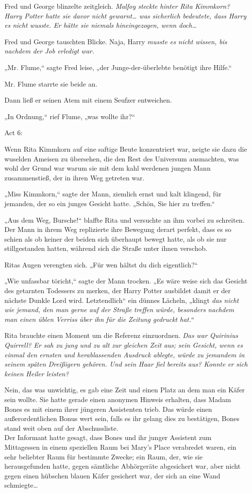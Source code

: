 {Fred und George blinzelte zeitgleich. \emph{Malfoy steckte hinter Rita Kimmkorn? Harry Potter hatte sie davor nicht gewarnt… was sicherlich bedeutete, dass Harry es nicht wusste. Er hätte sie niemals hineingezogen, wenn doch…}

Fred und George tauschten Blicke. Naja, Harry \emph{musste es nicht wissen, bis nachdem der Job erledigt war.}

„Mr. Flume,“ sagte Fred leise, „der Junge-der-überlebte benötigt ihre Hilfe.“

Mr. Flume starrte sie beide an.

Dann ließ er seinen Atem mit einem Seufzer entweichen.

„In Ordnung,“ rief Flume, „was wollte ihr?“

Act 6:

Wenn Rita Kimmkorn auf eine saftige Beute konzentriert war, neigte sie dazu die wuselden Ameisen zu übersehen, die den Rest des Universum ausmachten, was wohl der Grund war warum sie mit dem kahl werdenen jungen Mann zusammenstieß, der in ihren Weg getreten war.

„Miss Kimmkorn,“ sagte der Mann, ziemlich ernst und kalt klingend, für jemanden, der so ein junges Gesicht hatte. „Schön, Sie hier zu treffen.“

„Aus dem Weg, Bursche!“ blaffte Rita und versuchte an ihm vorbei zu schreiten. Der Mann in ihrem Weg replizierte ihre Bewegung derart perfekt, dass es so schien als ob keiner der beiden sich überhaupt bewegt hatte, als ob sie nur stillgestanden hatten, während sich die Straße unter ihnen verschob.

Ritas Augen verengten sich. „Für wen hältst du dich eigentlich?“

„Wie unfassbar töricht,“ sagte der Mann trocken. „Es wäre weise sich das Gesicht des getarnten Todessers zu merken, der Harry Potter ausbildet damit er der nächste Dunkle Lord wird. Letztendlich“ ein dünnes Lächeln, „klingt \emph{das nicht wie jemand, den man gerne auf der Straße treffen würde, besonders nachdem man einen üblen Verriss über ihn für die Zeitung gedruckt hat.“}

Rita brauchte einen Moment um die Referenz einzuordnen. \emph{Das war Quirinius Quirrell? Er sah zu jung und zu alt zur gleichen Zeit aus; sein Gesicht, wenn es einmal den ernsten und herablassenden Ausdruck ablegte, würde zu jemandem in seinem späten Dreißigern gehören. Und sein Haar fiel bereits aus? Konnte er sich keinen Heiler leisten?}

Nein, das was unwichtig, es gab eine Zeit und einen Platz an dem man ein Käfer sein wollte. Sie hatte gerade einen anonymen Hinweis erhalten, dass Madam Bones es mit einem ihrer jüngeren Assistenten trieb. Das würde einen außerordentlichen Bonus wert sein, falls es ihr gelang dies zu bestätigen, Bones stand weit oben auf der Abschussliste.\\ Der Informant hatte gesagt, dass Bones und ihr junger Assistent zum Mittagessen in einem speziellen Raum bei Mary's Place verabredet waren, ein sehr beliebter Raum für bestimmte Zwecke; ein Raum, der, wie sie herausgefunden hatte, gegen sämtliche Abhörgeräte abgesichert war, aber nicht gegen einen hübschen blauen Käfer gesichert war, der sich an eine Wand schmiegte…

}
